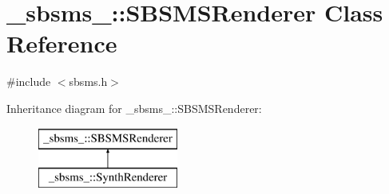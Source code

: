 \hypertarget{class__sbsms___1_1_s_b_s_m_s_renderer}{}\section{\+\_\+sbsms\+\_\+\+:\+:S\+B\+S\+M\+S\+Renderer Class Reference}
\label{class__sbsms___1_1_s_b_s_m_s_renderer}


{\ttfamily \#include $<$sbsms.\+h$>$}

Inheritance diagram for \+\_\+sbsms\+\_\+\+:\+:S\+B\+S\+M\+S\+Renderer\+:\begin{figure}[H]
\begin{center}
\leavevmode
\includegraphics[height=2.000000cm]{class__sbsms___1_1_s_b_s_m_s_renderer}
\end{center}
\end{figure}
